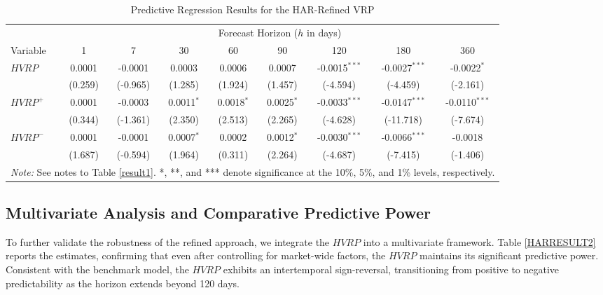 \documentclass[a4paper, 12pt]{article}    %
\begin{document}
\begin{table}[htbp]
\centering
\footnotesize 
\setlength{\tabcolsep}{3pt} 
\caption{Predictive Regression Results for the HAR-Refined VRP}
\label{HARresult}
\renewcommand{\arraystretch}{1.2}
\begin{tabular*}{\textwidth}{@{\extracolsep{\fill}}lcccccccc}
\toprule
 & \multicolumn{8}{c}{Forecast Horizon ($h$ in days)} \\
\cmidrule(lr){2-9}
Variable & 1 & 7 & 30 & 60 & 90 & 120 & 180 & 360 \\
\midrule
$HVRP$ & 0.0001 & -0.0001 & 0.0003 & 0.0006 & 0.0007 & -0.0015$^{***}$ & -0.0027$^{***}$ & -0.0022$^{*}$ \\
 & (0.259) & (-0.965) & (1.285) & (1.924) & (1.457) & (-4.594) & (-4.459) & (-2.161) \\
\addlinespace
$HVRP^+$ & 0.0001 & -0.0003 & 0.0011$^{*}$ & 0.0018$^{*}$ & 0.0025$^{*}$ & -0.0033$^{***}$ & -0.0147$^{***}$ & -0.0110$^{***}$ \\
 & (0.344) & (-1.361) & (2.350) & (2.513) & (2.265) & (-4.628) & (-11.718) & (-7.674) \\
\addlinespace
$HVRP^-$ & 0.0001 & -0.0001 & 0.0007$^{*}$ & 0.0002 & 0.0012$^{*}$ & -0.0030$^{***}$ & -0.0066$^{***}$ & -0.0018 \\
 & (1.687) & (-0.594) & (1.964) & (0.311) & (2.264) & (-4.687) & (-7.415) & (-1.406) \\
\bottomrule
\multicolumn{9}{l}{\scriptsize \textit{Note:} See notes to Table \ref{result1}. *, **, and *** denote significance at the 10\%, 5\%, and 1\% levels, respectively.} \\
\end{tabular*}
\end{table}

\subsection{Multivariate Analysis and Comparative Predictive Power}

To further validate the robustness of the refined approach, we integrate the $HVRP$ into a multivariate framework. Table \ref{HARRESULT2} reports the estimates, confirming that even after controlling for market-wide factors, the $HVRP$ maintains its significant predictive power. Consistent with the benchmark model, the $HVRP$ exhibits an intertemporal sign-reversal, transitioning from positive to negative predictability as the horizon extends beyond 120 days.
\end{document}
